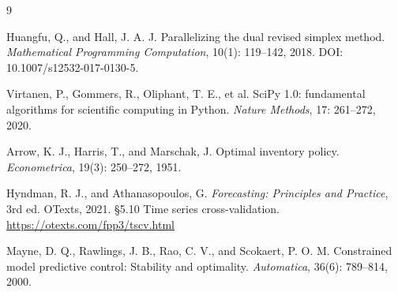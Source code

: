 
\begin{thebibliography}{9}

  Huangfu, Q., and Hall, J. A. J. Parallelizing the dual revised simplex method.
  \textit{Mathematical Programming Computation}, 10(1): 119--142, 2018.
  DOI: 10.1007/s12532-017-0130-5.

  Virtanen, P., Gommers, R., Oliphant, T. E., et al.
  SciPy 1.0: fundamental algorithms for scientific computing in Python.
  \textit{Nature Methods}, 17: 261--272, 2020.

  Arrow, K. J., Harris, T., and Marschak, J. Optimal inventory policy.
  \textit{Econometrica}, 19(3): 250--272, 1951.

  Hyndman, R. J., and Athanasopoulos, G.
  \textit{Forecasting: Principles and Practice}, 3rd ed.
  OTexts, 2021. \S5.10 Time series cross-validation.
  \url{https://otexts.com/fpp3/tscv.html}

  Mayne, D. Q., Rawlings, J. B., Rao, C. V., and Scokaert, P. O. M.
  Constrained model predictive control: Stability and optimality.
  \textit{Automatica}, 36(6): 789--814, 2000.

\end{thebibliography}
